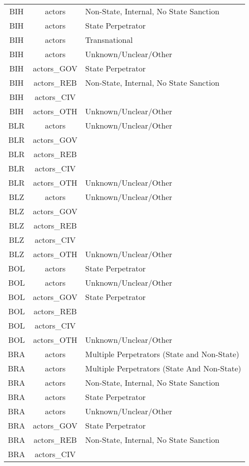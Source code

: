 \documentclass[12pt]{article}
\begin{document}
\begin{center}
\begin{longtable}{|c|c|p{10cm}|}
  BIH & actors & Non-State, Internal, No State Sanction \\ 
  BIH & actors & State Perpetrator \\ 
  BIH & actors & Transnational \\ 
  BIH & actors & Unknown/Unclear/Other \\ 
  BIH & actors\_GOV & State Perpetrator \\ 
  BIH & actors\_REB & Non-State, Internal, No State Sanction \\ 
  BIH & actors\_CIV &  \\ 
  BIH & actors\_OTH & Unknown/Unclear/Other \\ 
  BLR & actors & Unknown/Unclear/Other \\ 
  BLR & actors\_GOV &  \\ 
  BLR & actors\_REB &  \\ 
  BLR & actors\_CIV &  \\ 
  BLR & actors\_OTH & Unknown/Unclear/Other \\ 
  BLZ & actors & Unknown/Unclear/Other \\ 
  BLZ & actors\_GOV &  \\ 
  BLZ & actors\_REB &  \\ 
  BLZ & actors\_CIV &  \\ 
  BLZ & actors\_OTH & Unknown/Unclear/Other \\ 
  BOL & actors & State Perpetrator \\ 
  BOL & actors & Unknown/Unclear/Other \\ 
  BOL & actors\_GOV & State Perpetrator \\ 
  BOL & actors\_REB &  \\ 
  BOL & actors\_CIV &  \\ 
  BOL & actors\_OTH & Unknown/Unclear/Other \\ 
  BRA & actors & Multiple Perpetrators (State and Non-State) \\ 
  BRA & actors & Multiple Perpetrators (State And Non-State) \\ 
  BRA & actors & Non-State, Internal, No State Sanction \\ 
  BRA & actors & State Perpetrator \\ 
  BRA & actors & Unknown/Unclear/Other \\ 
  BRA & actors\_GOV & State Perpetrator \\ 
  BRA & actors\_REB & Non-State, Internal, No State Sanction \\ 
  BRA & actors\_CIV &  \\ 

\end{longtable}
\end{center}
\end{document}
